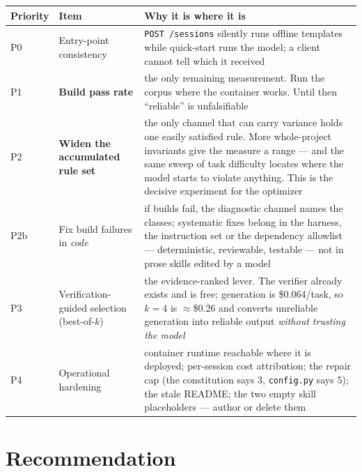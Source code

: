 \documentclass[11pt,a4paper]{article}
\begin{document}
\begin{center}
\begin{tabular}{@{}p{}p{}p{}@{}}
\toprule
\textbf{Priority} & \textbf{Item} & \textbf{Why it is where it is} \\
\midrule
P0 & Entry-point consistency & \texttt{POST /sessions} silently runs offline
templates while quick-start runs the model; a client cannot tell which it received \\
P1 & \textbf{Build pass rate} & the only remaining measurement. Run the corpus where
the container works. Until then ``reliable'' is unfalsifiable \\
P2 & \textbf{Widen the accumulated rule set} & the only channel that can carry
variance holds one easily satisfied rule. More whole-project invariants give the
measure a range --- and the same sweep of task difficulty locates where the model
starts to violate anything. This is the decisive experiment for the optimizer \\
P2b & Fix build failures in \emph{code} & if builds fail, the diagnostic channel names
the classes; systematic fixes belong in the harness, the instruction set or the
dependency allowlist --- deterministic, reviewable, testable --- not in prose skills
edited by a model \\
P3 & Verification-guided selection (best-of-$k$) & the evidence-ranked lever. The
verifier already exists and is free; generation is \$0.064/task, so $k{=}4$ is
$\approx$\$0.26 and converts unreliable generation into reliable output \emph{without
trusting the model} \\
P4 & Operational hardening & container runtime reachable where it is deployed;
per-session cost attribution; the repair cap (the constitution says 3,
\texttt{config.py} says 5); the stale README; the two empty skill placeholders ---
author or delete them \\
\bottomrule
\end{tabular}
\end{center}

\section{Recommendation}
\end{document}
